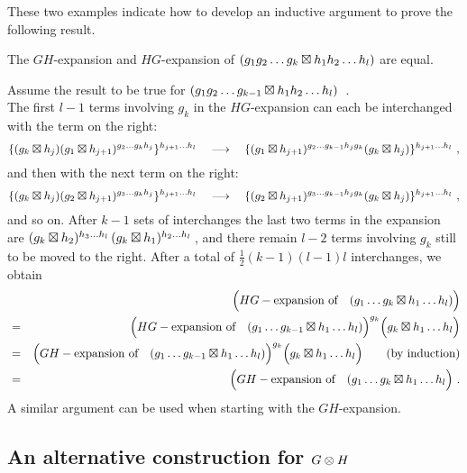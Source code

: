 \noindent
These two examples indicate how to develop an inductive argument
to prove the following result.

\begin{prop}\label{prop:GHeqHG}
The $GH$-expansion and $HG$-expansion of
$(g_1 g_2 \ldots g_k \boxtimes h_1 h_2 \ldots h_{l})$
are equal.
\end{prop}
\begin{pf}
Assume the result to be true for
$(g_1 g_2 \ldots g_{k-1} \boxtimes h_1 h_2 \ldots h_{l})$~.\\
The first $l-1$ terms involving  $g_k$  in the $HG$-expansion
can each be interchanged with the term on the right:
$$
\{(g_{k}\boxtimes h_{j}) (g_1 \boxtimes h_{j+1})^{g_2 \ldots g_{k}h_{j}}\}
  ^{h_{j+1} \ldots h_{l}}
\quad \longrightarrow \quad
\{(g_1 \boxtimes h_{j+1})^{g_2 \ldots g_{k-1}h_{j}g_{k}} (g_{k}\boxtimes h_{j})\}
  ^{h_{j+1} \ldots h_{l}}~,
$$
and then with the next term on the right:
$$
\{(g_{k}\boxtimes h_{j}) (g_2 \boxtimes h_{j+1})^{g_3 \ldots g_{k}h_{j}}\}
  ^{h_{j+1} \ldots h_{l}}
\quad \longrightarrow \quad
\{(g_2 \boxtimes h_{j+1})^{g_3 \ldots g_{k-1}h_{j}g_{k}} (g_{k}\boxtimes h_{j})\}
  ^{h_{j+1} \ldots h_{l}}~,
$$
and so on.
After $k-1$ sets of interchanges the last two terms in the expansion are
$(g_k \boxtimes h_2)^{h_3 \ldots h_{l}}\,(g_k \boxtimes h_1)^{h_2 \ldots h_{l}}\,$,
and there remain  $l-2$  terms involving  $g_k$  
still to be moved to the right.
After a total of  $\frac{1}{2}(k-1)(l-1)l$  interchanges, we obtain
\begin{eqnarray*}
   &   &  \Big(HG-\mbox{expansion of} 
            \quad(g_1 \ldots g_{k}\boxtimes h_1 \ldots h_{l})\Big) \\
   & = &  \Big(HG-\mbox{expansion of} 
            \quad(g_1 \ldots g_{k-1}\boxtimes h_1 \ldots 
           h_{l})\Big)^{g_{k}}\Big(g_{k}\boxtimes h_1 \ldots h_{l}\Big) \\
   & = &  \Big(GH-\mbox{expansion of} 
            \quad(g_1 \ldots g_{k-1}\boxtimes h_1 \ldots 
           h_{l})\Big)^{g_{k}}\Big(g_{k}\boxtimes h_1 \ldots h_{l}\Big) 
             \qquad \mbox{(by induction)} \\
   & = &  \Big(GH-\mbox{expansion of} 
            \quad(g_1 \ldots g_{k}\boxtimes h_1 \ldots h_{l}\Big) ~.
\end{eqnarray*}
A similar argument can be used when starting with the $GH$-expansion.
\end{pf}



\subsection{An alternative construction for $G \otimes H$}

